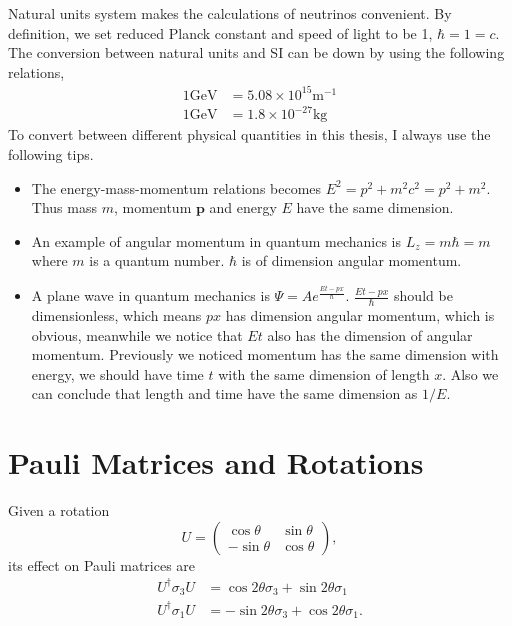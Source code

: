 Natural units system makes the calculations of neutrinos convenient. By definition, we set reduced Planck constant and speed of light to be 1, $\hbar = 1 = c$.
The conversion between natural units and SI can be down by using the following relations,
\begin{align}
   1 \mathrm{GeV} &= 5.08 \times 10^{15} \mathrm {m^{-1}} \\
   1 \mathrm{GeV} &= 1.8\times 10^{-27} \mathrm{kg}
\end{align}
To convert between different physical quantities in this thesis, I always use the following tips.
\begin{itemize}
    \item The energy-mass-momentum relations becomes $E^2 = p^2 + m^2c^2 = p^2 + m^2$. Thus mass $m$, momentum $\mathbf p$ and energy $E$ have the same dimension.
    \item An example of angular momentum in quantum mechanics is $L_z = m\hbar = m$ where $m$ is a quantum number. $\hbar$ is of dimension angular momentum.
    \item A plane wave in quantum mechanics is $\Psi = A e^{ \frac{E t - p x}{\hbar} }$. $\frac{E t - p x}{\hbar}$ should be dimensionless, which means $px$ has dimension angular momentum, which is obvious, meanwhile we notice that $E t$ also has the dimension of angular momentum. Previously we noticed momentum has the same dimension with energy, we should have time $t$ with the same dimension of length $x$. Also we can conclude that length and time have the same dimension as $1/E$.
\end{itemize}



\section{Pauli Matrices and Rotations}


Given a rotation
\begin{equation}
   U = \begin{pmatrix} \cos \theta & \sin \theta \\ -\sin\theta & \cos \theta \end{pmatrix}, 
\end{equation}
its effect on Pauli matrices are
\begin{align}
      U^\dagger \sigma_3 U  &=\cos 2\theta \sigma_3 + \sin 2\theta \sigma_1 \\
  U^\dagger \sigma_1 U & = -\sin 2\theta \sigma_3 + \cos 2\theta \sigma_1.
\end{align}


